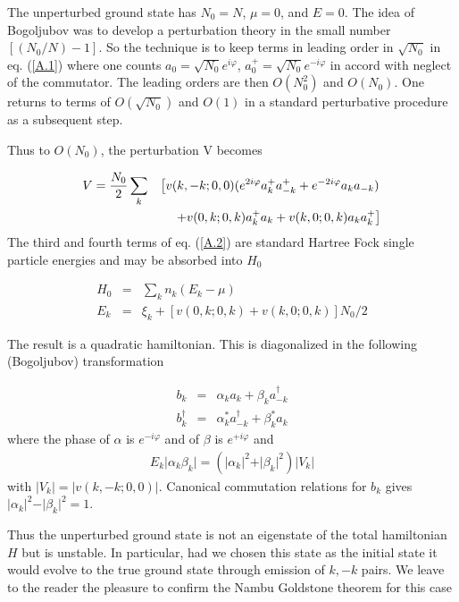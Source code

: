 \documentclass[12pt,oneside]{report}
\begin{document}
The unperturbed ground state has $ N_0 = N$,  $\mu = 0 $, and
$ E = 0 $. The idea of Bogoljubov \cite{Bogo} was to develop a perturbation
theory in the small number $ [ (N_0/N) - 1 ] $. So the technique
is to keep terms in leading order in $ \sqrt {N_0} $ in eq. (\ref{A.1}) 
where one counts $ a_0 = \sqrt {N_0} e^{i \varphi} $, $a_{0} ^{+} =
\sqrt {N_0} e^{- i \varphi} $ in accord with neglect of the
commutator. The leading orders are then $ O(N_{0}^{2}) $ and $ O
(N_0) $. One returns to terms of $ O(\sqrt {N_0}) $ and $ O (1) $
in a standard perturbative procedure as a subsequent step.

Thus to $ O(N_0) $, the perturbation V becomes

\begin{eqnarray}
V = { N_0 \over 2}  \sum_k &&\left[ v(k, - k; 0,0)( e^{ 2 i \varphi} a_{k}^{+}
a_{-k}^+ + e^{- 2 i \varphi} a_k a_{-k} ) \right. \nonumber \\
&&\left. +v(0, k; 0, k)
 a_{k}^{+} a_k  + v(k, 0; 0,k) a_{k} a_k^+ \right]
\label{A.2} 
\end{eqnarray}
The third and fourth terms of eq. (\ref{A.2}) are standard Hartree Fock
single particle energies and may be absorbed into $ H_0 $

\begin{eqnarray}
H_0 & = & \sum _k n_k ( E_ k - \mu) \nonumber \\
E_k & = & \xi _k + [ v (0, k; 0, k) + v (k, 0; 0, k)] N_0/2
\label {A.3}
\end{eqnarray}

The result is a quadratic hamiltonian. This is diagonalized in the
following (Bogoljubov) transformation

\begin{eqnarray}
b_k & = & \alpha_k a_k + \beta_k a_{-k}^{\dagger} \nonumber \\
b_{k} ^{\dagger} & = & \alpha _{k} ^{*} a_{-k}^{\dagger} + \beta
_{k}^{*} a_k \label {A.4}
\end{eqnarray} 
where the phase of $ \alpha $ is $ e^{-i\varphi} $ and of $
\beta $ is $ e ^{+i \varphi} $ and 
\begin{eqnarray}
E_k \vert \alpha_k \beta_k \vert =( \vert \alpha _k \vert^2 +
\vert \beta_k \vert ^2) \vert V_k \vert \label {A.5}
\end{eqnarray}
with $ \vert V_k \vert = \vert v(k, -k; 0, 0) \vert$. Canonical commutation
relations for $ b_k $ gives $ \vert \alpha_k \vert ^2 - \vert \beta _k
\vert ^2 = 1 $.

Thus the unperturbed ground state is not an eigenstate 
of the total hamiltonian $H$ but is unstable. In particular, had we chosen this
state as the initial state it  would evolve to the true ground state through
emission of
 $ k,-k $ pairs. We leave  to the reader the pleasure to confirm the
Nambu Goldstone theorem for this case 
\end{document}
